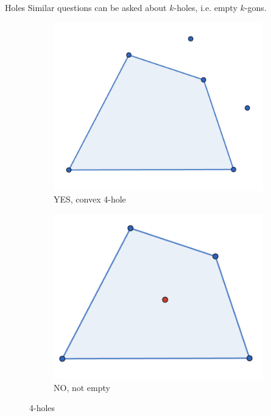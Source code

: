 \documentclass{beamer}
\begin{document}
\begin{frame}{Holes}
Similar questions can be asked about $k$-holes, i.e. empty $k$-gons.


\begin{figure}
\centering
    \begin{subfigure}[t]{0.45\textwidth}
        \includegraphics[width=\textwidth]{4hole.png}
        \caption{YES, convex 4-hole}
        \label{fig4hole}
    \end{subfigure}
    \begin{subfigure}[t]{0.45\textwidth}
        \includegraphics[width=\textwidth]{not_4hole.png}
        \caption{NO, not empty}
        \label{fignot4hole}
    \end{subfigure}
\caption{4-holes}
\label{fighole}
\end{figure}

\end{frame}
\end{document}
